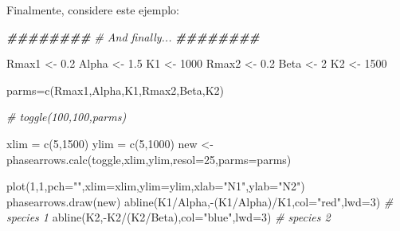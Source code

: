 \documentclass[
]{article}
\newenvironment{Shaded}{\begin{snugshade}}{\end{snugshade}}
\newcommand{\AttributeTok}[1]{\textcolor[rgb]{0.77,0.63,0.00}{#1}}
\newcommand{\CommentTok}[1]{\textcolor[rgb]{0.56,0.35,0.01}{\textit{#1}}}
\newcommand{\DecValTok}[1]{\textcolor[rgb]{0.00,0.00,0.81}{#1}}
\newcommand{\DocumentationTok}[1]{\textcolor[rgb]{0.56,0.35,0.01}{\textbf{\textit{#1}}}}
\newcommand{\FloatTok}[1]{\textcolor[rgb]{0.00,0.00,0.81}{#1}}
\newcommand{\FunctionTok}[1]{\textcolor[rgb]{0.00,0.00,0.00}{#1}}
\newcommand{\NormalTok}[1]{#1}
\newcommand{\OtherTok}[1]{\textcolor[rgb]{0.56,0.35,0.01}{#1}}
\newcommand{\SpecialCharTok}[1]{\textcolor[rgb]{0.00,0.00,0.00}{#1}}
\newcommand{\StringTok}[1]{\textcolor[rgb]{0.31,0.60,0.02}{#1}}
\begin{document}
Finalmente, considere este ejemplo:

\begin{Shaded}
\begin{Highlighting}[]
\DocumentationTok{\#\#\#\#\#\#\#\#}
\CommentTok{\# And finally...}
\DocumentationTok{\#\#\#\#\#\#\#\#}

\NormalTok{Rmax1 }\OtherTok{\textless{}{-}} \FloatTok{0.2}
\NormalTok{Alpha }\OtherTok{\textless{}{-}} \FloatTok{1.5}
\NormalTok{K1 }\OtherTok{\textless{}{-}} \DecValTok{1000}
\NormalTok{Rmax2 }\OtherTok{\textless{}{-}} \FloatTok{0.2}
\NormalTok{Beta }\OtherTok{\textless{}{-}} \DecValTok{2}
\NormalTok{K2 }\OtherTok{\textless{}{-}} \DecValTok{1500}

\NormalTok{parms}\OtherTok{=}\FunctionTok{c}\NormalTok{(Rmax1,Alpha,K1,Rmax2,Beta,K2)}

\CommentTok{\# toggle(100,100,parms)}

\NormalTok{xlim }\OtherTok{=} \FunctionTok{c}\NormalTok{(}\DecValTok{5}\NormalTok{,}\DecValTok{1500}\NormalTok{)}
\NormalTok{ylim }\OtherTok{=} \FunctionTok{c}\NormalTok{(}\DecValTok{5}\NormalTok{,}\DecValTok{1000}\NormalTok{)}
\NormalTok{new }\OtherTok{\textless{}{-}} \FunctionTok{phasearrows.calc}\NormalTok{(toggle,xlim,ylim,}\AttributeTok{resol=}\DecValTok{25}\NormalTok{,}\AttributeTok{parms=}\NormalTok{parms)}

\FunctionTok{plot}\NormalTok{(}\DecValTok{1}\NormalTok{,}\DecValTok{1}\NormalTok{,}\AttributeTok{pch=}\StringTok{""}\NormalTok{,}\AttributeTok{xlim=}\NormalTok{xlim,}\AttributeTok{ylim=}\NormalTok{ylim,}\AttributeTok{xlab=}\StringTok{"N1"}\NormalTok{,}\AttributeTok{ylab=}\StringTok{"N2"}\NormalTok{)}
\FunctionTok{phasearrows.draw}\NormalTok{(new)}
\FunctionTok{abline}\NormalTok{(K1}\SpecialCharTok{/}\NormalTok{Alpha,}\SpecialCharTok{{-}}\NormalTok{(K1}\SpecialCharTok{/}\NormalTok{Alpha)}\SpecialCharTok{/}\NormalTok{K1,}\AttributeTok{col=}\StringTok{"red"}\NormalTok{,}\AttributeTok{lwd=}\DecValTok{3}\NormalTok{)   }\CommentTok{\# species 1}
\FunctionTok{abline}\NormalTok{(K2,}\SpecialCharTok{{-}}\NormalTok{K2}\SpecialCharTok{/}\NormalTok{(K2}\SpecialCharTok{/}\NormalTok{Beta),}\AttributeTok{col=}\StringTok{"blue"}\NormalTok{,}\AttributeTok{lwd=}\DecValTok{3}\NormalTok{)   }\CommentTok{\# species 2}
\end{Highlighting}
\end{Shaded}
\end{document}
